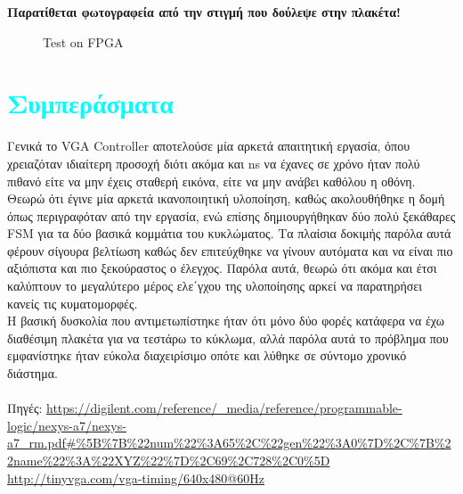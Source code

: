 \documentclass[12pt,a4paper]{article}
\begin{document}
	\textbf{Παρατίθεται φωτογραφεία από την στιγμή που δούλεψε στην πλακέτα!}
	\begin{figure} [H]
		\caption{Test on FPGA}
		\label{Test on FPGA}
	\end{figure}
	
	
	\section{\textcolor{cyan}{Συμπεράσματα}}
	Γενικά το VGA Controller αποτελούσε μία αρκετά απαιτητική εργασία, όπου χρειαζόταν ιδιαίτερη προσοχή διότι ακόμα και ns να έχανες σε χρόνο ήταν πολύ πιθανό είτε να μην έχεις σταθερή εικόνα, είτε να μην ανάβει καθόλου η οθόνη. Θεωρώ ότι έγινε μία αρκετά ικανοποιητική υλοποίηση, καθώς ακολουθήθηκε η δομή όπως περιγραφόταν από την εργασία, ενώ επίσης δημιουργήθηκαν δύο πολύ ξεκάθαρες FSM για τα δύο βασικά κομμάτια του κυκλώματος. Τα πλαίσια δοκιμής παρόλα αυτά φέρουν σίγουρα βελτίωση καθώς δεν επιτεύχθηκε να γίνουν αυτόματα και να είναι πιο αξιόπιστα και πιο ξεκούραστος ο έλεγχος. Παρόλα αυτά, θεωρώ ότι ακόμα και έτσι καλύπτουν το μεγαλύτερο μέρος ελε΄γχου της υλοποίησης αρκεί να παρατηρήσει κανείς τις κυματομορφές.\\
	 Η βασική δυσκολία που αντιμετωπίστηκε ήταν ότι μόνο δύο φορές κατάφερα να έχω διαθέσιμη πλακέτα για να τεστάρω το κύκλωμα, αλλά παρόλα αυτά το πρόβλημα που εμφανίστηκε ήταν εύκολα διαχειρίσιμο οπότε και λύθηκε σε σύντομο χρονικό διάστημα.\\ \\
	 Πηγές: \url{https://digilent.com/reference/_media/reference/programmable-logic/nexys-a7/nexys-a7_rm.pdf#%5B%7B%22num%22%3A65%2C%22gen%22%3A0%7D%2C%7B%22name%22%3A%22XYZ%22%7D%2C69%2C728%2C0%5D}\\
	 \url{http://tinyvga.com/vga-timing/640x480@60Hz}

	
	
	
	
	
	
\end{document}
